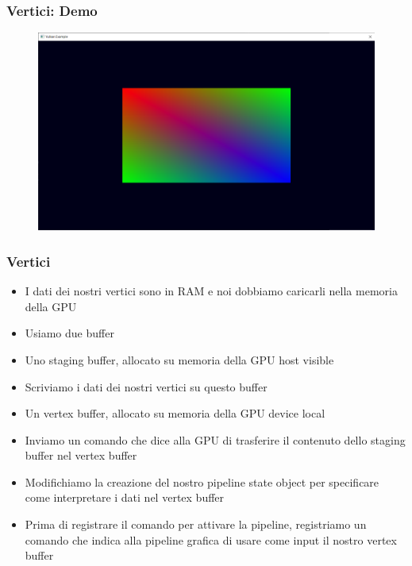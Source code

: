 \begin{frame}
\frametitle{Vertici: Demo}
\begin{figure}[ht]
    \centering
    \includegraphics[scale=0.25]{images/SlidesVertices/RenderQuad.png}
\end{figure}
\end{frame}

\begin{frame}
\frametitle{Vertici}
\begin{itemize}
\item I dati dei nostri vertici sono in RAM e noi dobbiamo caricarli nella memoria della GPU
\item Usiamo due buffer
\item Uno staging buffer, allocato su memoria della GPU host visible
\item Scriviamo i dati dei nostri vertici su questo buffer
\item Un vertex buffer, allocato su memoria della GPU device local
\item Inviamo un comando che dice alla GPU di trasferire il contenuto dello staging buffer nel vertex buffer
\item Modifichiamo la creazione del nostro pipeline state object per specificare come interpretare i dati nel vertex buffer
\item Prima di registrare il comando per attivare la pipeline, registriamo un comando che indica alla pipeline grafica di usare come input il nostro vertex buffer
\end{itemize}
\end{frame}
